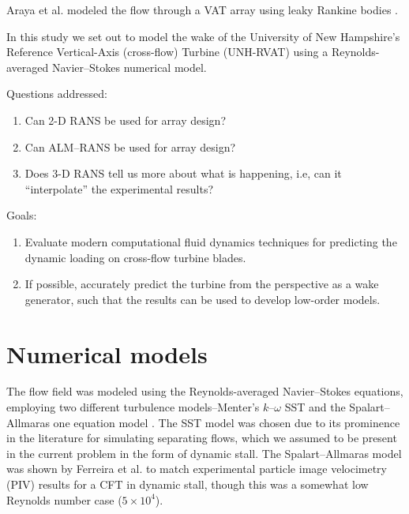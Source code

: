 \documentclass[aip,graphicx]{revtex4-1}
\begin{document}
Araya et al. modeled the flow through a VAT array using leaky Rankine bodies
\cite{Araya2014}.

In this study we set out to model the wake of the University of New Hampshire's
Reference Vertical-Axis (cross-flow) Turbine (UNH-RVAT) using a
Reynolds-averaged Navier--Stokes numerical model.

Questions addressed:

\begin{enumerate}

    \item Can 2-D RANS be used for array design?
    
    \item Can ALM--RANS be used for array design?

    \item Does 3-D RANS tell us more about what is happening, i.e, can it
    ``interpolate'' the experimental results?

\end{enumerate}

Goals:

\begin{enumerate}

    \item Evaluate modern computational fluid dynamics techniques for predicting
    the dynamic loading on cross-flow turbine blades.

    \item If possible, accurately predict the turbine from the perspective as a
    wake generator, such that the results can be used to develop low-order
    models.

\end{enumerate}


\section{Numerical models}

The flow field was modeled using the Reynolds-averaged Navier--Stokes equations,
employing two different turbulence models--Menter's $k$--$\omega$ SST
\cite{Menter1994} and the Spalart--Allmaras one equation model
\cite{Spalart1992}. The SST model was chosen due to its prominence in the
literature for simulating separating flows, which we assumed to be present in
the current problem in the form of dynamic stall. The Spalart--Allmaras model
was shown by Ferreira et al. \cite{Ferreira2007} to match experimental particle
image velocimetry (PIV) results for a CFT in dynamic stall, though this was a
somewhat low Reynolds number case ($5 \times 10^4$).
\end{document}
